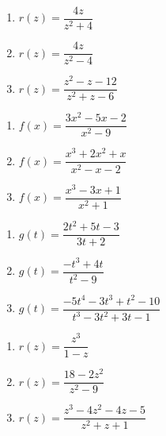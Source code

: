 \begin{multicols}{3}
\begin{enumerate}
\setcounter{enumi}{\value{HW}}

\item $r(z) = \dfrac{4z}{z^2+4}$
\item $r(z) = \dfrac{4z}{z^2-4}$
\item $r(z) = \dfrac{z^2-z-12}{z^2+z-6}$

\setcounter{HW}{\value{enumi}}
\end{enumerate}
\end{multicols}

\begin{multicols}{3}
\begin{enumerate}
\setcounter{enumi}{\value{HW}}

\item $f(x) = \dfrac{3x^2-5x-2}{x^2-9}$
\item $f(x) = \dfrac{x^3+2x^2+x}{x^2-x-2}$
\item $f(x) = \dfrac{x^{3} - 3x + 1}{x^{2} + 1}$

\setcounter{HW}{\value{enumi}}
\end{enumerate}
\end{multicols}

\begin{multicols}{3}
\begin{enumerate}
\setcounter{enumi}{\value{HW}}

\item $g(t) = \dfrac{2t^{2} + 5t - 3}{3t + 2}$
\item $g(t) = \dfrac{-t^{3} + 4t}{t^{2} - 9}$
\item \small $g(t) = \dfrac{-5t^{4} - 3t^{3} + t^{2} - 10}{t^{3} - 3t^{2} + 3t - 1}$ \normalsize 

\setcounter{HW}{\value{enumi}}
\end{enumerate}
\end{multicols}


\begin{multicols}{3}
\begin{enumerate}
\setcounter{enumi}{\value{HW}}

\item $r(z) = \dfrac{z^3}{1-z}$
\item $r(z) = \dfrac{18-2z^2}{z^2-9}$
\item $r(z) = \dfrac{z^3-4z^2-4z-5}{z^2+z+1}$ \label{alltheasymplast}


\setcounter{HW}{\value{enumi}}
\end{enumerate}
\end{multicols}

